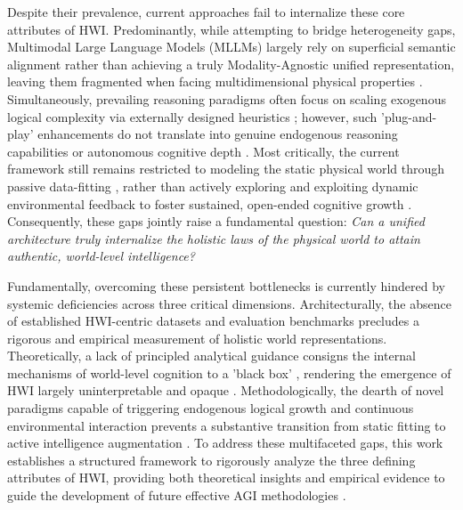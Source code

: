 Despite their prevalence, current approaches fail to internalize these core attributes of HWI.
Predominantly, while attempting to bridge heterogeneity gaps, Multimodal Large Language Models (MLLMs) largely rely on superficial semantic alignment \cite{radford2021learning} rather than achieving a truly Modality-Agnostic unified representation, leaving them fragmented when facing multidimensional physical properties \cite{wu2024next, tong2024eyes}.
Simultaneously, prevailing reasoning paradigms often focus on scaling exogenous logical complexity via externally designed heuristics \cite{wei2022chain, yao2023tree}; however, such 'plug-and-play' enhancements do not translate into genuine endogenous reasoning capabilities or autonomous cognitive depth \cite{huang2023large}.
Most critically, the current framework still remains restricted to modeling the static physical world through passive data-fitting \cite{kaplan2020scaling}, rather than actively exploring and exploiting dynamic environmental feedback to foster sustained, open-ended cognitive growth \cite{wang2023voyager}.
Consequently, these gaps jointly raise a fundamental question: \emph{Can a unified architecture truly internalize the holistic laws of the physical world to attain authentic, world-level intelligence?}

Fundamentally, overcoming these persistent bottlenecks is currently hindered by systemic deficiencies across three critical dimensions.
Architecturally, the absence of established HWI-centric datasets and evaluation benchmarks \cite{srivastava2022behavior, gu2023maniskill2} precludes a rigorous and empirical measurement of holistic world representations.
Theoretically, a lack of principled analytical guidance consigns the internal mechanisms of world-level cognition to a 'black box' \cite{li2022emergent}, rendering the emergence of HWI largely uninterpretable and opaque \cite{nanda2023progress}.
Methodologically, the dearth of novel paradigms capable of triggering endogenous logical growth and continuous environmental interaction prevents a substantive transition from static fitting to active intelligence augmentation \cite{park2023generative}.
To address these multifaceted gaps, this work establishes a structured framework to rigorously analyze the three defining attributes of HWI, providing both theoretical insights and empirical evidence to guide the development of future effective AGI methodologies \cite{bengio2021deep}.


